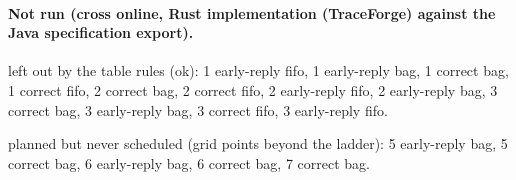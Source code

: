 \documentclass[10pt]{article}
\begin{document}
\paragraph{Not run (cross online, Rust implementation (TraceForge) against the Java specification export).}
left out by the table rules (ok): 1 early-reply fifo, 1 early-reply bag, 1 correct bag, 1 correct fifo, 2 correct bag, 2 correct fifo, 2 early-reply fifo, 2 early-reply bag, 3 correct bag, 3 early-reply bag, 3 correct fifo, 3 early-reply fifo.\par
planned but never scheduled (grid points beyond the ladder): 5 early-reply bag, 5 correct bag, 6 early-reply bag, 6 correct bag, 7 correct bag.\par
\end{document}
